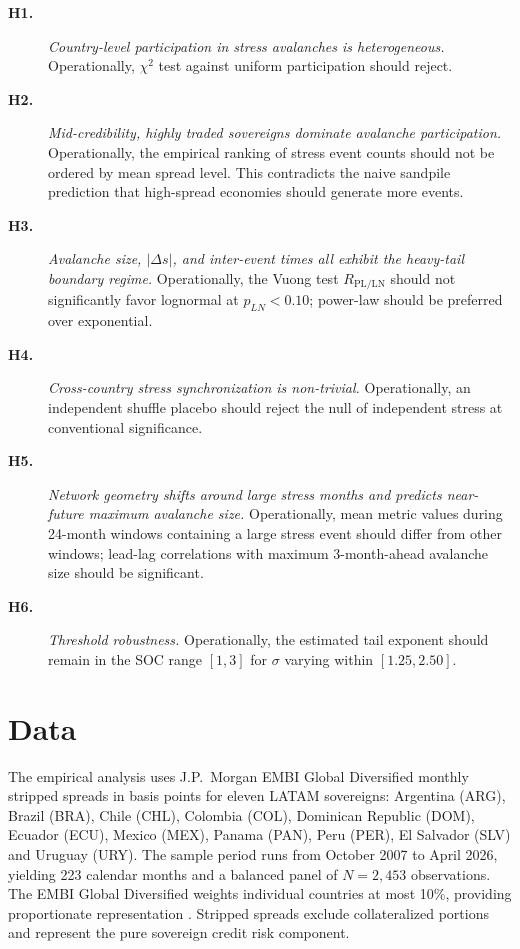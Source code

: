 \documentclass[12pt,a4paper]{article}
\begin{document}
\begin{description}
\item[\textbf{H1.}] \emph{Country-level participation in stress avalanches is
heterogeneous.} Operationally, $\chi^2$ test against uniform participation
should reject.
\item[\textbf{H2.}] \emph{Mid-credibility, highly traded sovereigns dominate
avalanche participation.} Operationally, the empirical ranking of stress
event counts should not be ordered by mean spread level. This contradicts the
naive sandpile prediction that high-spread economies should generate more
events.
\item[\textbf{H3.}] \emph{Avalanche size, $|\Delta s|$, and inter-event times
all exhibit the heavy-tail boundary regime.} Operationally, the Vuong test
$R_{\mathrm{PL/LN}}$ should not significantly favor lognormal at $p_{LN}<0.10$;
power-law should be preferred over exponential.
\item[\textbf{H4.}] \emph{Cross-country stress synchronization is
non-trivial.} Operationally, an independent shuffle placebo should reject the
null of independent stress at conventional significance.
\item[\textbf{H5.}] \emph{Network geometry shifts around large stress months
and predicts near-future maximum avalanche size.} Operationally, mean
metric values during 24-month windows containing a large stress event
should differ from other windows; lead-lag correlations with maximum
3-month-ahead avalanche size should be significant.
\item[\textbf{H6.}] \emph{Threshold robustness.} Operationally, the
estimated tail exponent should remain in the SOC range $[1,3]$ for $\sigma$
varying within $[1.25, 2.50]$.
\end{description}

\section{Data}
\label{sec:data}

The empirical analysis uses J.P.~Morgan EMBI Global Diversified monthly
stripped spreads in basis points for eleven LATAM sovereigns: Argentina (ARG),
Brazil (BRA), Chile (CHL), Colombia (COL), Dominican Republic (DOM), Ecuador
(ECU), Mexico (MEX), Panama (PAN), Peru (PER), El Salvador (SLV) and Uruguay
(URY). The sample period runs from October 2007 to April 2026, yielding 223
calendar months and a balanced panel of $N=2{,}453$ observations. The EMBI
Global Diversified weights individual countries at most 10\%, providing
proportionate representation \citep{Longstaff2011}. Stripped spreads exclude
collateralized portions and represent the pure sovereign credit risk
component.
\end{document}
